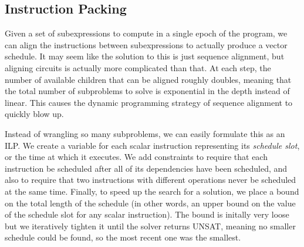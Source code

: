 \subsection{Instruction Packing}
Given a set of subexpressions to compute in a single epoch of the program, we can align the instructions between subexpressions to actually produce a vector schedule.
It may seem like the solution to this is just sequence alignment, but aligning circuits is actually more complicated than that.
At each step, the number of available children that can be aligned roughly doubles, meaning that the total number of subproblems to solve is exponential in the depth instead of linear. 
This causes the dynamic programming strategy of sequence alignment to quickly blow up.

Instead of wrangling so many subproblems, we can easily formulate this as an ILP.
We create a variable for each scalar instruction representing its {\em schedule slot}, or the time at which it executes.
We add constraints to require that each instruction be scheduled after all of its dependencies have been scheduled, and also to require that two instructions with different operations never be scheduled at the same time. 
Finally, to speed up the search for a solution, we place a bound on the total length of the schedule (in other words, an upper bound on the value of the schedule slot for any scalar instruction).
The bound is initally very loose but we iteratively tighten it until the solver returns UNSAT, meaning no smaller schedule could be found, so the most recent one was the smallest. 

